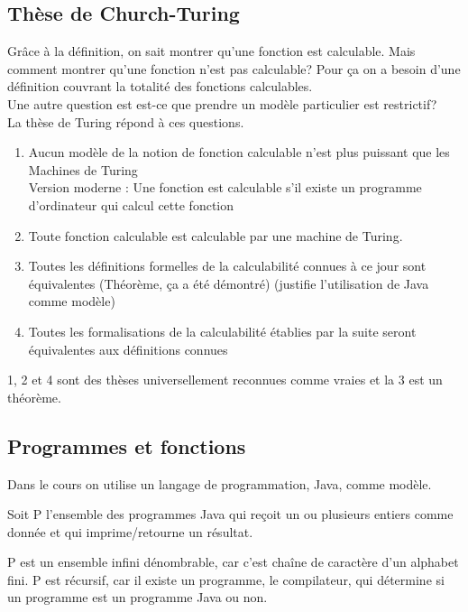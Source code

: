 \subsection{Thèse de Church-Turing}
\label{sub:th_se_de_church_turing}
Grâce à la définition, on sait montrer qu'une fonction est calculable. Mais comment
montrer qu'une fonction n'est pas calculable? Pour ça on a besoin d'une définition
couvrant la totalité des fonctions calculables. \\
Une autre question est est-ce que prendre un modèle particulier est restrictif?\\
La thèse de Turing répond à ces questions.
\begin{enumerate}
	\item Aucun modèle de la notion de fonction calculable n'est plus puissant
		que les Machines de Turing \\
		Version moderne : Une fonction est calculable s'il existe un 
		programme d'ordinateur qui calcul cette fonction
	\item Toute fonction calculable est calculable par une machine de Turing.
	\item Toutes les définitions formelles de la calculabilité connues à ce 
		jour sont équivalentes (Théorème, ça a été démontré) (justifie 
		l'utilisation de Java comme modèle)
	\item Toutes les formalisations de la calculabilité établies par la 
		suite seront équivalentes aux définitions connues
\end{enumerate}
1, 2 et 4 sont des thèses universellement reconnues comme vraies et la 3 est un
théorème.


\subsection{Programmes et fonctions}
\label{sub:programmes_et_fonctions}
Dans le cours on utilise un langage de programmation, Java, comme modèle.

\begin{mydef}[P]
	Soit P l'ensemble des programmes Java qui reçoit un ou plusieurs entiers comme 
	donnée et qui imprime/retourne un résultat.
\end{mydef}

\begin{myprop}
	P est un ensemble infini dénombrable, car c'est chaîne de caractère d'un 
	alphabet fini. P est récursif, car il existe un programme, le compilateur, qui détermine 
	si un programme est un programme Java ou non.
\end{myprop}

